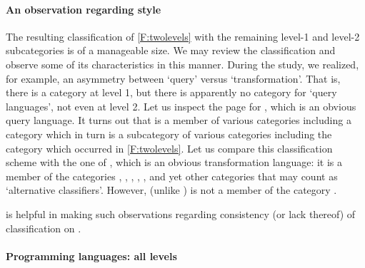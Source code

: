 
\vspace{-27\in}

\paragraph*{\textbf{An observation regarding \Wikipedia{} style}}

The resulting classification of \autoref{F:twolevels} with the remaining level-1 and level-2 subcategories is of a manageable size. We may review the classification and observe some of its characteristics in this manner. During the study, we realized, for example, an asymmetry between `query' versus `transformation'. That is, there is a category  at level 1, but there is apparently no category for `query languages', not even at level 2. Let us inspect the page for , which is an obvious query language. It turns out that  is a member of various categories including a category  which in turn is a subcategory of various categories including the category  which occurred in \autoref{F:twolevels}. Let us compare this classification scheme with the one of , which is an obvious transformation language: it is a member of the categories , , , , , and yet other categories that may count as `alternative classifiers'. However,  (unlike ) is not a member of the category .

\WikiTax{} is helpful in making such observations regarding consistency (or lack thereof) of classification on \Wikipedia.


\vspace{-27\in}

\paragraph*{\textbf{Programming languages: all levels}}

